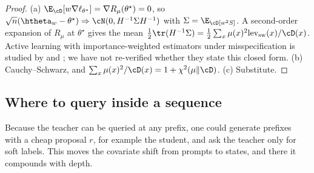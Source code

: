 \begin{proof}
(a) $\E_\cD[w\nabla\ell_{\theta^\star}]=\nabla R_\mu(\theta^\star)=0$, so $\sqrt n(\htheta_w-\theta^\star)\Rightarrow\cN(0,H^{-1}\Sigma H^{-1})$
with $\Sigma=\E_\cD[w^2S]$. A second-order expansion of $R_\mu$ at $\theta^\star$ gives the mean
$\frac12\tr(H^{-1}\Sigma)=\frac12\sum_x\mu(x)^2\mathrm{lev}_{\mathrm{sw}}(x)/\cD(x)$. Active learning with importance-weighted
estimators under misspecification is studied by \citet{kanamori2003active} and \citet{sugiyama2006active};
we have not re-verified whether they state this closed form.
(b) Cauchy--Schwarz, and $\sum_x\mu(x)^2/\cD(x)=1+\chi^2(\mu\|\cD)$.
(c) Substitute.
\end{proof}

\subsection{Where to query inside a sequence}\label{sec:path-design}

Because the teacher can be queried at any prefix, one could generate prefixes with a cheap proposal $r$,
for example the student, and ask the teacher only for soft labels. This moves the covariate shift from
prompts to states, and there it compounds with depth.

